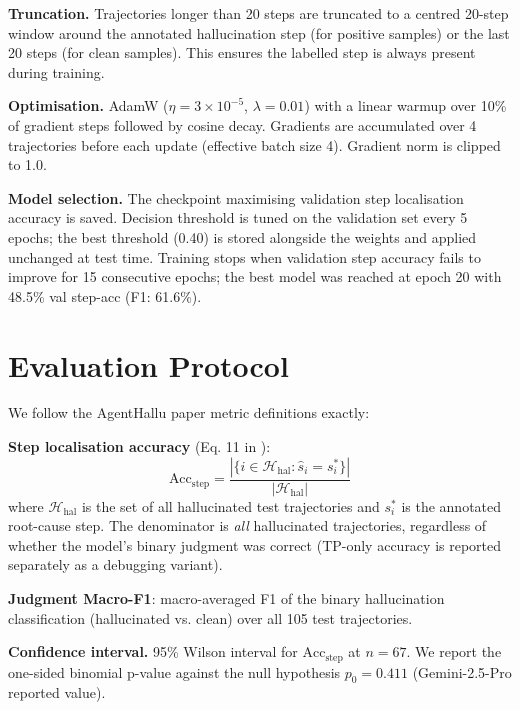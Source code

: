 \documentclass[11pt]{article}
\begin{document}
\textbf{Truncation.} Trajectories longer than 20 steps are truncated to a centred 20-step window around the annotated hallucination step (for positive samples) or the last 20 steps (for clean samples). This ensures the labelled step is always present during training.

\textbf{Optimisation.} AdamW ($\eta{=}3{\times}10^{-5}$, $\lambda{=}0.01$) with a linear warmup over 10\% of gradient steps followed by cosine decay. Gradients are accumulated over 4 trajectories before each update (effective batch size 4). Gradient norm is clipped to 1.0.

\textbf{Model selection.} The checkpoint maximising validation step localisation accuracy is saved. Decision threshold is tuned on the validation set every 5 epochs; the best threshold (0.40) is stored alongside the weights and applied unchanged at test time. Training stops when validation step accuracy fails to improve for 15 consecutive epochs; the best model was reached at epoch 20 with 48.5\% val step-acc (F1: 61.6\%).

\section{Evaluation Protocol}

We follow the AgentHallu paper metric definitions exactly:

\textbf{Step localisation accuracy} (Eq. 11 in \citealt{agenthallu}):
\begin{equation}
  \text{Acc}_\text{step} = \frac{|\{i \in \mathcal{H}_\text{hal} : \hat{s}_i = s^*_i\}|}{|\mathcal{H}_\text{hal}|}
\end{equation}
where $\mathcal{H}_\text{hal}$ is the set of all hallucinated test trajectories and $s^*_i$ is the annotated root-cause step. The denominator is \emph{all} hallucinated trajectories, regardless of whether the model's binary judgment was correct (TP-only accuracy is reported separately as a debugging variant).

\textbf{Judgment Macro-F1}: macro-averaged F1 of the binary hallucination classification (hallucinated vs. clean) over all 105 test trajectories.

\textbf{Confidence interval.} 95\% Wilson interval for $\text{Acc}_\text{step}$ at $n{=}67$. We report the one-sided binomial p-value against the null hypothesis $p_0 = 0.411$ (Gemini-2.5-Pro reported value).
\end{document}
